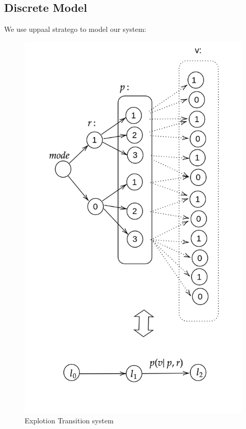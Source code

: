 \documentclass[conference]{IEEEtran}
\begin{document}
\subsection{Discrete Model}

We use uppaal stratego to model our system:

\begin{figure}[h]  %
  \includegraphics[scale = 0.25]{4}
  \caption{Explotion Transition system}
  \centering
\end{figure}
\end{document}
